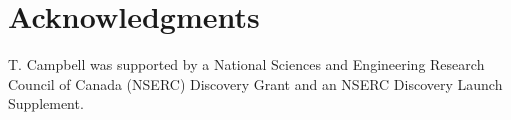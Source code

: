 \documentclass{article}
\begin{document}


\section*{Acknowledgments}
T. Campbell was supported by a National Sciences and Engineering Research Council of Canada (NSERC) Discovery Grant and an NSERC Discovery Launch Supplement.






\appendix






\end{document}
